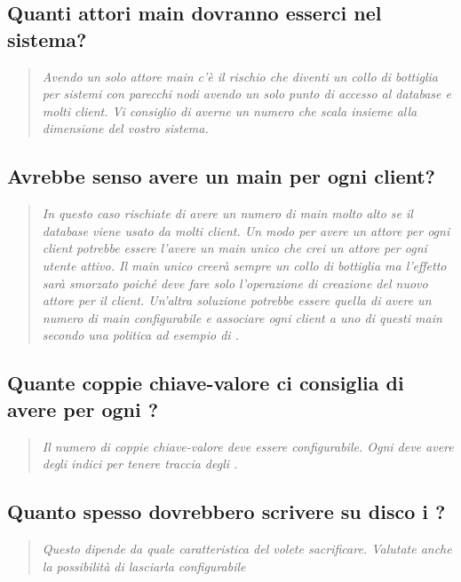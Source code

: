 \documentclass{scalatekids-article}
\begin{document}
\subsection{Quanti attori main dovranno esserci nel sistema?}
\begin{quote}
  \textit{Avendo un solo attore main c'è il rischio che diventi un collo di bottiglia per sistemi con parecchi nodi avendo un solo punto di accesso al database e molti client. Vi consiglio di averne un numero che scala insieme alla dimensione del vostro sistema.\\}
\end{quote}
\subsection{Avrebbe senso avere un main per ogni client?}
\begin{quote}
  \textit{In questo caso rischiate di avere un numero di main molto alto se il database viene usato da molti client. Un modo per avere un attore per ogni client potrebbe essere l'avere un main unico che crei un attore per ogni utente attivo. Il main unico creerà sempre un collo di bottiglia ma l'effetto sarà smorzato poiché deve fare solo l'operazione di creazione del nuovo attore per il client. Un'altra soluzione potrebbe essere quella di avere un numero di main configurabile e associare ogni client a uno di questi main secondo una politica ad esempio di .\\}
\end{quote}
\subsection{Quante coppie chiave-valore ci consiglia di avere per ogni ?}
\begin{quote}
  \textit{Il numero di coppie chiave-valore deve essere configurabile. Ogni  deve avere degli indici per tenere traccia degli .\\}
\end{quote}
\subsection{Quanto spesso dovrebbero scrivere su disco i ?}
\begin{quote}
  \textit{Questo dipende da quale caratteristica del  volete sacrificare. Valutate anche la possibilità di lasciarla configurabile\\}
\end{quote}
\end{document}
